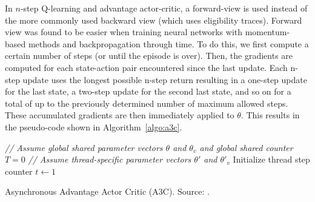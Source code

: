 In $n$-step Q-learning and advantage actor-critic, a forward-view is used instead of the more commonly used backward view (which uses eligibility traces).
Forward view was found to be easier when training neural networks with momentum-based methods and backpropagation through time.
To do this, we first compute a certain number of steps (or until the episode is over).
Then, the gradients are computed for each state-action pair encountered since the last update.
Each n-step update uses the longest possible n-step return resulting in a one-step update for the last state, a two-step update for the second last state, and so on for a total of up to the previously determined number of maximum allowed steps.
These accumulated gradients are then immediately applied to $\theta$.
This results in the pseudo-code shown in Algorithm~\ref{algo:a3c}.\\
\begin{algorithm}[htb]
\DontPrintSemicolon
\emph{// Assume global shared parameter vectors $\theta$ and $\theta_v$ and global shared counter $T=0$}\;
\emph{// Assume thread-specific parameter vectors $\theta'$ and $\theta'_v$}\;
Initialize thread step counter $t\gets 1$\;
\caption[Asynchronous Advantage Actor Critic]{Asynchronous Advantage Actor Critic (A3C). Source: \cite{Mnih2016AsynchronousLearning}.}
\label{algo:a3c}
\end{algorithm}
